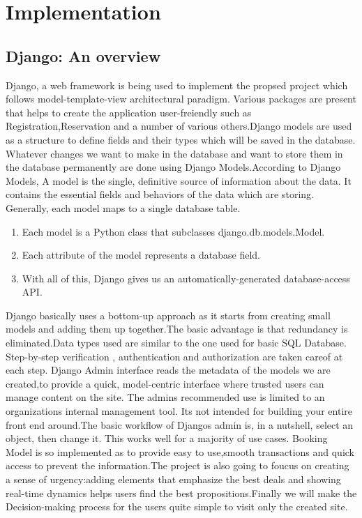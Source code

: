 \documentclass[12pt]{report}
\begin{document}
\chapter{Implementation}
\section{Django: An overview}
Django, a web framework is being used to
implement the propsed project which follows
model-template-view architectural paradigm.
Various packages are present that helps to create
the
application
user-freiendly
such
as
Registration,Reservation and a number of
various others.Django models are used as a
structure to define fields and their types which
will be saved in the database. Whatever changes
we want to make in the database and want to
store them in the database permanently are
done using Django Models.According to Django
Models, A model is the single, definitive source
of information about the data. It contains the
essential fields and behaviors of the data which
are storing. Generally, each model maps to a
single database table.
\begin{enumerate}
\item Each model is a
Python
class
that
subclasses
django.db.models.Model.
\item Each attribute of
the model represents a database field. 
\item With
all
of
this,
Django
gives
us
an
automatically-generated database-access API.
\end{enumerate}
Django basically uses a bottom-up approach as
it starts from creating small models and adding
them up together.The basic advantage is that
redundancy is eliminated.Data types used are
similar to the one used for basic SQL Database.
Step-by-step verification , authentication and
authorization are taken careof at each step.
Django Admin interface reads the metadata of
the models we are created,to provide a quick,
model-centric interface where trusted users can
manage content on the site.
The admins recommended use is limited to an organizations
internal management tool. Its not intended for
building your entire front end around.The basic
workflow of Djangos admin is, in a nutshell,
select an object, then change it. This works well
for a majority of use cases.\newline
  Booking Model is so implemented as to provide
easy to use,smooth transactions and quick access
to prevent the information.The project is also
going to foucus on creating a sense of
urgency:adding elements that emphasize the
best deals and showing real-time dynamics helps
users find the best propositions.Finally we will
make the Decision-making process for the users
quite simple to visit only the created site. \newpage
\end{document}
